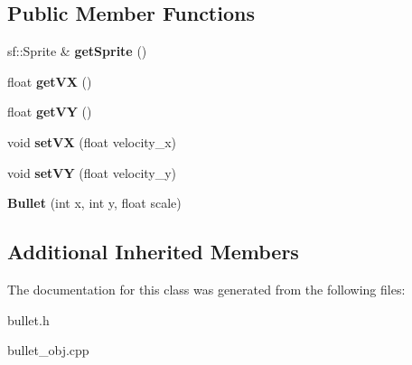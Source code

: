 \subsection*{Public Member Functions}
\begin{DoxyCompactItemize}
\item 
\mbox{\label{class_bullet_aaaf2d5b5a33b32f68a767c3905714dea}} 
sf\+::\+Sprite \& {\bfseries get\+Sprite} ()
\item 
\mbox{\label{class_bullet_a085bb7c0585ded8b8fb6fab17ea6d936}} 
float {\bfseries get\+VX} ()
\item 
\mbox{\label{class_bullet_ac0c532a9810fea73f8cb68a4e9180b26}} 
float {\bfseries get\+VY} ()
\item 
\mbox{\label{class_bullet_a01f8720e8456eb80d49b82454e119620}} 
void {\bfseries set\+VX} (float velocity\+\_\+x)
\item 
\mbox{\label{class_bullet_ad16379f51f3ac3b55c3f8aa0710db3cb}} 
void {\bfseries set\+VY} (float velocity\+\_\+y)
\item 
\mbox{\label{class_bullet_ab96a969270f7c38d9e13d4e97800ef85}} 
{\bfseries Bullet} (int x, int y, float scale)
\end{DoxyCompactItemize}
\subsection*{Additional Inherited Members}


The documentation for this class was generated from the following files\+:\begin{DoxyCompactItemize}
\item 
bullet.\+h\item 
bullet\+\_\+obj.\+cpp\end{DoxyCompactItemize}
